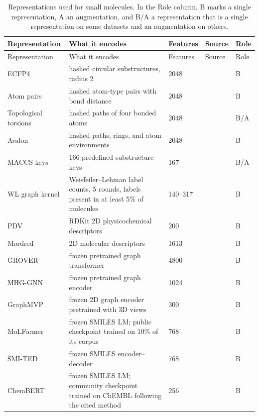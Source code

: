 {\footnotesize %
\begin{longtable}{P{3.0cm}P{5.0cm}P{1.5cm}P{1.5cm}P{1.4cm}}
\caption[Representations used for small molecules.]{Representations used for small molecules. In the Role column, B marks a single representation, A an augmentation, and B/A a representation that is a single representation on some datasets and an augmentation on others.}\label{tab:reps_smallmol}\\
\toprule
Representation & What it encodes & Features & Source & Role \\
\midrule
\endfirsthead
\toprule
Representation & What it encodes & Features & Source & Role \\
\midrule
\endhead
\bottomrule
\endfoot
ECFP4 & hashed circular substructures, radius 2 & 2048 & \citep{rogers2010} & B \\
Atom pairs & hashed atom-type pairs with bond distance & 2048 & \citep{Carhart1985} & B \\
Topological torsions & hashed paths of four bonded atoms & 2048 & \citep{Nilakantan1987} & B/A \\
Avalon & hashed paths, rings, and atom environments & 2048 & \citep{Gedeck2006} & B \\
MACCS keys & 166 predefined substructure keys & 167 & \citep{Durant2002} & B/A \\
WL graph kernel & Weisfeiler--Lehman label counts, 5 rounds, labels present in at least 5\% of molecules & 140--317 & \citep{Shervashidze2011} & B \\
PDV & RDKit 2D physicochemical descriptors & 200 & \citep{rdkit} & B \\
Mordred & 2D molecular descriptors & 1613 & \citep{Moriwaki2018} & B \\
GROVER & frozen pretrained graph transformer & 4800 & \citep{Rong2020GROVER} & B \\
MHG-GNN & frozen pretrained graph encoder & 1024 & \citep{kishimoto2023} & B \\
GraphMVP & frozen 2D graph encoder pretrained with 3D views & 300 & \citep{Liu2022GraphMVP} & B \\
MoLFormer & frozen SMILES LM; public checkpoint trained on 10\% of its corpus & 768 & \citep{ross2022} & B \\
SMI-TED & frozen SMILES encoder--decoder & 768 & \citep{Soares2025} & B \\
ChemBERT & frozen SMILES LM; community checkpoint trained on ChEMBL following the cited method & 256 & \citep{Zhang2022ChemBERT} & B \\

\end{longtable}}

